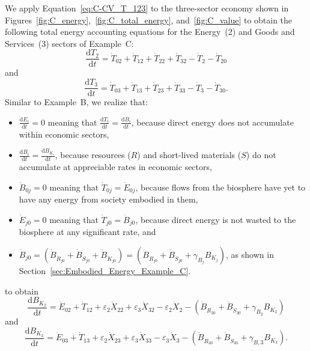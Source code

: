 We apply Equation~\ref{eq:C-CV_T_123} to the three-sector
economy shown in 
Figures~\ref{fig:C_energy},~\ref{fig:C_total_energy}, and~\ref{fig:C_value}
to obtain the following total energy accounting equations
for the Energy~(2) and Goods and Services~(3) sectors 
of Example~C: %
%
\begin{equation} \label{eq:C-Total_Energy_Sec_2-a}
	\frac{\mathrm{d}T_{2}}{\mathrm{d}t} 
	= \dot{T}_{02}  
	+ \dot{T}_{12}
	+ \dot{T}_{22}
	+ \dot{T}_{32}
	- \dot{T}_{2}
	- \dot{T}_{20}
\end{equation}
%
and
%
\begin{equation} \label{eq:C-Total_Energy_Sec_3-a}
	\frac{\mathrm{d}T_{3}}{\mathrm{d}t} 
	= \dot{T}_{03}  
	+ \dot{T}_{13}
	+ \dot{T}_{23}
	+ \dot{T}_{33}
	- \dot{T}_{3}
	- \dot{T}_{30}.
\end{equation}
%
Similar to Example~B, we realize that: 
%
\begin{itemize}
	\item{$\frac{\mathrm{d}E_i}{\mathrm{d}t} = 0$
		meaning that
		$\frac{\mathrm{d}T_i}{\mathrm{d}t} = \frac{\mathrm{d}B_i}{\mathrm{d}t}$, 
		because direct energy
		does not accumulate within economic sectors,}
	\item{$\frac{\mathrm{d}B_i}{\mathrm{d}t} = \frac{\mathrm{d}B_{K_{i}}}{\mathrm{d}t}$,
		because resources ($R$) and short-lived materials ($S$) do not 
		accumulate at appreciable rates in economic sectors,}
	\item{$\dot{B}_{0j} = 0$ meaning that $\dot{T}_{0j} = \dot{E}_{0j}$,
		because flows from the biosphere have yet to have any energy from society embodied in them,}
	\item{$\dot{E}_{j0} = 0$ meaning that $\dot{T}_{j0} = \dot{B}_{j0}$, 
		because direct energy is not wasted to the biosphere at any significant rate, and} 
	\item{$\dot{B}_{j0} = \left( \dot{B}_{\dot{R}_{j0}} 
							+ \dot{B}_{\dot{S}_{j0}}
							+ \dot{B}_{\dot{K}_{j0}}
							\right)
						= \left( \dot{B}_{\dot{R}_{j0}} 
							+ \dot{B}_{\dot{S}_{j0}}
							+ \gamma_{B_{j}} B_{K_{j}}
							\right)$, as shown in Section~\ref{sec:Embodied_Energy_Example_C}.}
\end{itemize}
%
to obtain
%
\begin{equation} \label{eq:C-Total_Energy_Sec_2-b}
	\frac{\mathrm{d}B_{K_{2}}}{\mathrm{d}t}
	= \dot{E}_{02}
	+ \dot{T}_{12}
	+ \varepsilon_{2} \dot{X}_{22}
	+ \varepsilon_{3} \dot{X}_{32}
	- \varepsilon_{2} \dot{X}_{2}
	- \left( \dot{B}_{\dot{R}_{20}} 
							+ \dot{B}_{\dot{S}_{20}}
							+ \gamma_{B_{2}} B_{K_{2}}
							\right)
\end{equation}
%
and
%
\begin{equation} \label{eq:C-Total_Energy_Sec_3-b}
	\frac{\mathrm{d}B_{K_{3}}}{\mathrm{d}t}
	= \dot{E}_{03}
	+ \dot{T}_{13}
	+ \varepsilon_{2} \dot{X}_{23}
	+ \varepsilon_{3} \dot{X}_{33}
	- \varepsilon_{3} \dot{X}_{3}
	- \left( \dot{B}_{\dot{R}_{30}} 
							+ \dot{B}_{\dot{S}_{30}}
							+ \gamma_{B,3} B_{K_{3}}
							\right).
\end{equation}


